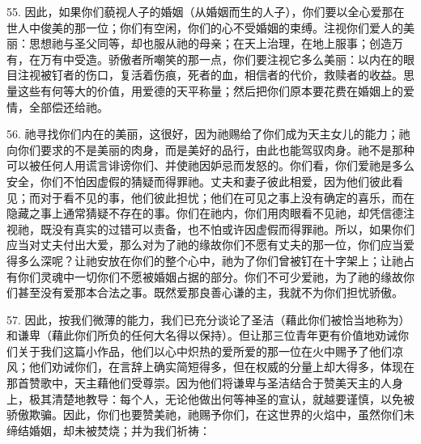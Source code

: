 55. 因此，如果你们藐视人子的婚姻（从婚姻而生的人子），你们要以全心爱那在世人中俊美的那一位；你们有空闲，你们的心不受婚姻的束缚。注视你们爱人的美丽：思想祂与圣父同等，却也服从祂的母亲；在天上治理，在地上服事；创造万有，在万有中受造。骄傲者所嘲笑的那一点，你们要注视它多么美丽：以内在的眼目注视被钉者的伤口，复活着伤痕，死者的血，相信者的代价，救赎者的收益。思量这些有何等大的价值，用爱德的天平称量；然后把你们原本要花费在婚姻上的爱情，全部偿还给祂。\par

56. 祂寻找你们内在的美丽，这很好，因为祂赐给了你们成为天主女儿的能力；祂向你们要求的不是美丽的肉身，而是美好的品行，由此也能驾驭肉身。祂不是那种可以被任何人用谎言诽谤你们、并使祂因妒忌而发怒的。你们看，你们爱祂是多么安全，你们不怕因虚假的猜疑而得罪祂。丈夫和妻子彼此相爱，因为他们彼此看见；而对于看不见的事，他们彼此担忧；他们在可见之事上没有确定的喜乐，而在隐藏之事上通常猜疑不存在的事。你们在祂内，你们用肉眼看不见祂，却凭信德注视祂，既没有真实的过错可以责备，也不怕或许因虚假而得罪祂。所以，如果你们应当对丈夫付出大爱，那么对为了祂的缘故你们不愿有丈夫的那一位，你们应当爱得多么深呢？让祂安放在你们的整个心中，祂为了你们曾被钉在十字架上；让祂占有你们灵魂中一切你们不愿被婚姻占据的部分。你们不可少爱祂，为了祂的缘故你们甚至没有爱那本合法之事。既然爱那良善心谦的主，我就不为你们担忧骄傲。\par

57. 因此，按我们微薄的能力，我们已充分谈论了圣洁（藉此你们被恰当地称为）和谦卑（藉此你们所负的任何大名得以保持）。但让那三位青年更有价值地劝诫你们关于我们这篇小作品，他们以心中炽热的爱所爱的那一位在火中赐予了他们凉风；他们劝诫你们，在言辞上确实简短得多，但在权威的分量上却大得多，体现在那首赞歌中，天主藉他们受尊崇。因为他们将谦卑与圣洁结合于赞美天主的人身上，极其清楚地教导：每个人，无论他做出何等神圣的宣认，就越要谨慎，以免被骄傲欺骗。因此，你们也要赞美祂，祂赐予你们，在这世界的火焰中，虽然你们未缔结婚姻，却未被焚烧；并为我们祈祷：\par

